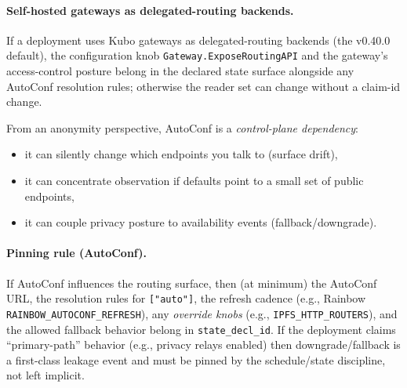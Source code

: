 \documentclass[11pt]{article}
\begin{document}
\paragraph{Self-hosted gateways as delegated-routing backends.}
If a deployment uses Kubo gateways as delegated-routing backends (the v0.40.0 default), the configuration knob \texttt{Gateway.ExposeRoutingAPI} and the gateway's access-control posture belong in the declared state surface alongside any AutoConf resolution rules; otherwise the reader set can change without a claim-id change.\cite{kuboReleaseV040,kuboConfigExposeRoutingAPI}

From an anonymity perspective, AutoConf is a \emph{control-plane dependency}:
\begin{itemize}[leftmargin=*]
\item it can silently change which endpoints you talk to (surface drift),
\item it can concentrate observation if defaults point to a small set of public endpoints,
\item it can couple privacy posture to availability events (fallback/downgrade).
\end{itemize}

\paragraph{Pinning rule (AutoConf).}
If AutoConf influences the routing surface, then (at minimum) the AutoConf URL, the resolution rules for \texttt{["auto"]}, the refresh cadence (e.g., Rainbow \texttt{RAINBOW\_AUTOCONF\_\allowbreak REFRESH}), any \emph{override knobs} (e.g., \texttt{IPFS\_HTTP\_ROUTERS}), and the allowed fallback behavior belong in \texttt{state\_decl\_id}.
If the deployment claims ``primary-path'' behavior (e.g., privacy relays enabled) then downgrade/fallback is a first-class leakage event and must be pinned by the schedule/state discipline, not left implicit.\cite{series:operationalA,series:planstateequiv}
\end{document}
